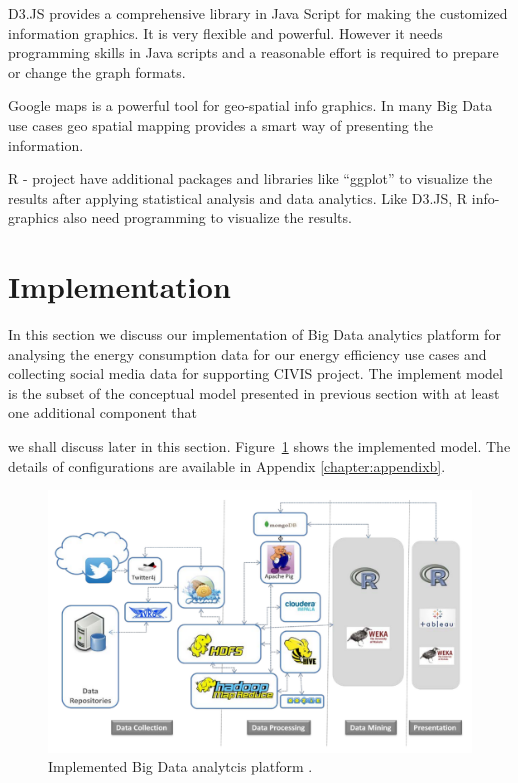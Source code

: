 D3.JS provides a comprehensive library in Java Script for making the customized information graphics. It is very flexible and powerful. However it needs programming skills in Java scripts and a reasonable effort is required to prepare or change the graph formats. 

Google maps is a powerful tool for geo-spatial info graphics. In many Big Data use cases geo spatial mapping provides a smart way of presenting the information.

R - project have additional packages and libraries like ``ggplot'' to visualize the results after applying statistical analysis and data analytics. Like D3.JS, R info-graphics also need programming to visualize the results.

\section{Implementation}  
In this section we discuss our implementation of Big Data analytics platform for analysing the energy consumption data for our energy efficiency use cases and collecting social media data for supporting CIVIS project. The implement model is the subset of the conceptual model presented in previous section with at least one additional component that \begin{flushright}

\end{flushright}we shall discuss later in this section. Figure~\ref{fig:iplatform} shows the implemented model. The details of configurations are available in Appendix \ref{chapter:appendixb}.  
\begin{figure}[!ht]
    \begin{center}
      \includegraphics[width=\textwidth]{images/iplatform.pdf}
      \caption{Implemented Big Data analytcis platform .}
      \label{fig:iplatform}
    \end{center}
  \end{figure} 
